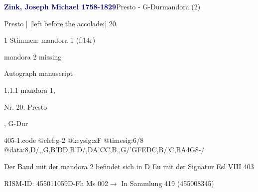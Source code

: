 \documentclass[twocolumn]{book}
\begin{document}
\par \vspace{7pt} \textcolor{darkblue}{\textbf{Zink, Joseph Michael  1758-1829}}\hfillplus{\textbf{[405]}}\newline Presto - G-Dur\newline mandora (2)
\par \begin{itshape}[f.14r, at left:] Presto | [left before the accolade:] 20.\end{itshape} 
\par \textcolor{darkblue}{}  1 Stimmen: mandora 1  (f.14r)\newline \begin{small} mandora 2 missing\end{small} \newline Autograph manuscript
\par 1.1.1  mandora 1, \begin{itshape}Nr. 20. Presto\end{itshape}, G-Dur  
\begin{filecontents*}{405-1.code}
@clef:g-2
@keysig:xF
@timesig:6/8
@data:8,D/,,G,B'DD,B'D/,DA'CC,B,,G/{'GFE}{DC,B}/'C,BA4G8-/
\end{filecontents*}
\newline
%
\par Der Band mit der mandora 2 befindet sich in D Eu mit der Signatur Esl VIII 403
\par RISM-ID: 455011059\newline D-Fh  Ms 002\newline $\rightarrow$ In Sammlung 419 (455008345)
      
\end{document}
